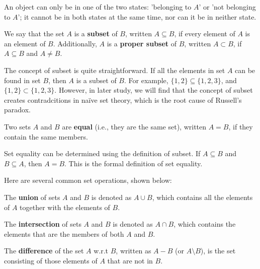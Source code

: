 \documentclass[oneside]{book}
\begin{document}
\begin{note}
An object can only be in one of the two states: 'belonging to $A$' or 'not belonging to $A$'; it cannot be in both states at the same time, nor can it be in neither state.
\end{note}


\begin{definition}[Subset]
We say that the set $A$ is a \textbf{subset} of $B$, written $A \subseteq B$, if every element of $A$ is an element of $B$. Additionally, $A$ is a \textbf{proper subset} of $B$, written $A \subset B$, if $A \subseteq B$ and $A \ne B$.
\end{definition}

The concept of subset is quite straightforward. If all the elements in set $A$ can be found in set $B$, then $A$ is a subset of $B$. For example, $\{1, 2\} \subseteq \{1, 2, 3\}$, and $\{1, 2\} \subset \{1, 2, 3\}$. However, in later study, we will find that the concept of subset creates contradcitions in naïve set theory, which is the root cause of Russell's paradox.

\begin{definition}[Equality]
Two sets $A$ and $B$ are \textbf{equal} (i.e., they are the same set), written $A = B$, if they contain the same members.
\end{definition}

Set equality can be determined using the definition of subset. If $A \subseteq B$ and $B \subseteq A$, then $A = B$. This is the formal definition of set equality.

Here are several common set operations, shown below:

\begin{definition}
The \textbf{union} of sets $A$ and $B$ is denoted as $A \cup B$, which contains all the elements of $A$ together with the elements of $B$.
\end{definition}

\begin{definition}
The \textbf{intersection} of sets $A$ and $B$ is denoted as $A \cap B$, which contains the elements that are the members of both $A$ and $B$.
\end{definition}

\begin{definition}
The \textbf{difference} of the set $A$ w.r.t $B$, written as $A - B$ (or $A \setminus B$), is the set consisting of those elements of $A$ that are not in $B$.
\end{definition}
\end{document}
